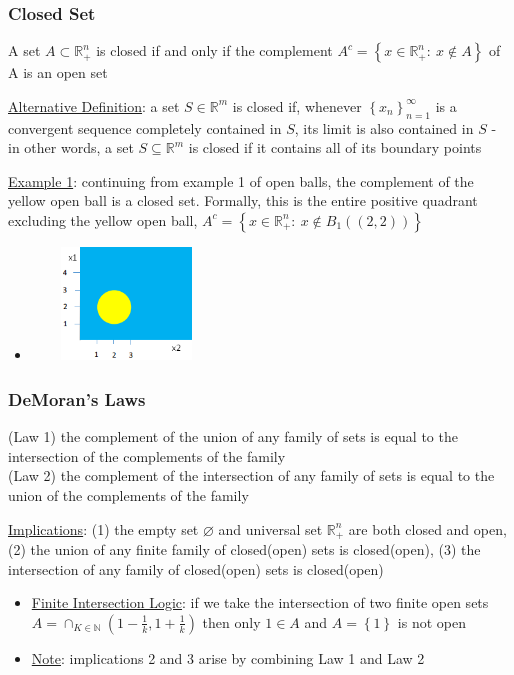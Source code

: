 \documentclass{article}
\begin{document}
\subsubsection{Closed Set}
A set $A \subset \mathbb{R}_{+}^{n}$ is closed if and only if the complement $A^{c} = \left\{ x \in \mathbb{R}_{+}^{n}: \ x \notin A \right\}$ of A is an open set \par \vspace{0.3em}
  \underline{Alternative Definition}: a set $S \in \mathbb{R}^{m}$ is closed if, whenever $\left\{ x_{n} \right\}_{n=1}^{\infty}$ is a convergent sequence completely contained in $S$, its limit is also contained in $S$ - in other words, a set $S \subseteq \mathbb{R}^{m}$ is closed if it contains all of its boundary points
  \par
  \underline{Example 1}: continuing from example 1 of open balls, the complement of the yellow open ball is a closed set. Formally, this is the entire positive quadrant excluding the yellow open ball, $A^{c} = \left\{ x \in \mathbb{R}_{+}^{n}: \ x \notin B_{1}((2,2)) \right\}$
  \begin{itemize}
    \item  \includegraphics[width=5cm, height=3cm]{pic4}
  \end{itemize}
  \par
\vspace{6mm}
\subsubsection{DeMoran's Laws}
(Law 1) the complement of the union of any family of sets is equal to the intersection of the complements of the family \\ (Law 2) the complement of the intersection of any family of sets is equal to the union of the complements of the family \par \vspace{0.3em}
  \underline{Implications}: (1) the empty set $\varnothing$ and universal set $\mathbb{R}_{+}^{n}$ are both closed and open, (2) the union of any finite family of closed(open) sets is closed(open), (3) the intersection of any family of closed(open) sets is closed(open)
  \begin{itemize}
    \item  \underline{Finite Intersection Logic}: if we take the intersection of two finite open sets $A = \cap_{K \in \mathbb{N}} (1 - \tfrac{1}{k}, 1 + \tfrac{1}{k})$ then only $1 \in A$ and $A = \left\{ 1 \right\}$ is not open
    \item  \underline{Note}: implications 2 and 3 arise by combining Law 1 and Law 2
  \end{itemize}
  \par
\vspace{6mm}
\end{document}
